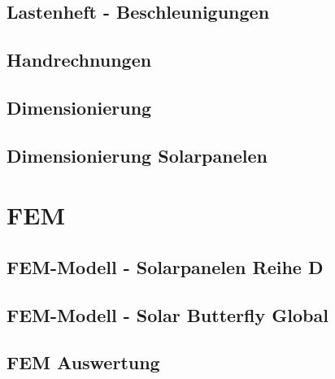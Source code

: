   \subsection{Lastenheft - Beschleunigungen}
  \label{e:Lastenheft}
  \subsection{Handrechnungen}
  \label{e:Handrechnungen}
  \subsection{Dimensionierung}
  \label{e:Dimensionierung}
  \subsection{Dimensionierung Solarpanelen}
  \label{e:Solarpanelen}



\section{FEM}
  \subsection{FEM-Modell - Solarpanelen Reihe D}
  \label{e:Panelen}
  \subsection{FEM-Modell - Solar Butterfly Global}
  \label{e:Globales FEM}
  \subsection{FEM Auswertung}
  \label{e:FEM Auswertung}
